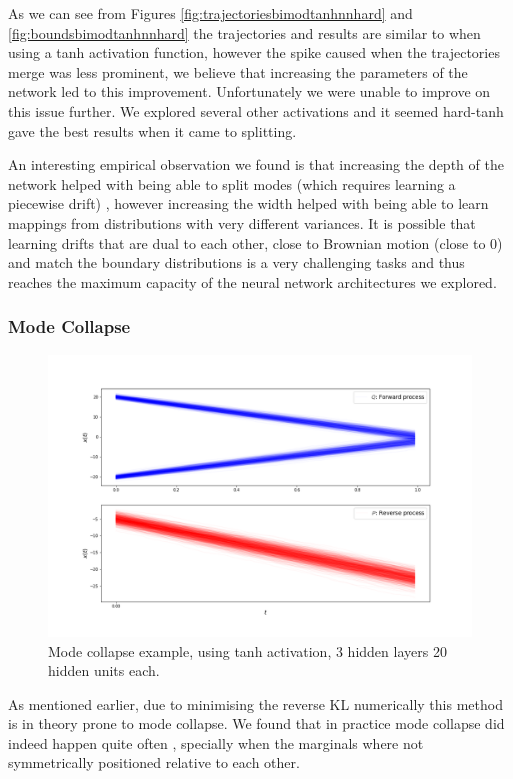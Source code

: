 \documentclass[a4paper,12pt,twoside,openright]{report}
\theoremstyle{definition}
\begin{document}
As we can see from Figures \ref{fig:trajectoriesbimodtanhnnhard} and \ref{fig:boundsbimodtanhnnhard} the trajectories and results are similar to when using a tanh activation function, however the spike caused when the trajectories merge was less prominent, we believe that increasing the parameters of the network led to this improvement. Unfortunately we were unable to improve on this issue further.  We explored several other activations and it seemed hard-tanh gave the best results when it came to splitting.

An interesting empirical observation we found is that increasing the depth of the network helped with being able to split modes (which requires learning a piecewise drift) , however increasing the width helped with being  able to learn mappings from distributions with very different  variances. It is possible that learning drifts that are dual to each other, close to Brownian motion (close to 0) and match the boundary distributions is a very challenging tasks and thus reaches the maximum capacity of the neural network architectures we explored.
\subsubsection{Mode Collapse}
\begin{figure}[t]
    \centering
    \includegraphics[scale=0.4,trim={4.3cm 1cm 2.5cm 0}, clip]{images/Control/mode_colapse_final_relu_trajectories.png}
    \caption{ Mode collapse example, using tanh activation, 3 hidden layers 20 hidden units each.}
    \label{fig:trajectoriesmodecop}
\end{figure}
As mentioned earlier, due to minimising the reverse KL numerically this method is in theory prone to mode collapse. We found that in practice mode collapse did indeed happen quite often , specially when the marginals where not symmetrically positioned relative to each other. 
\end{document}
